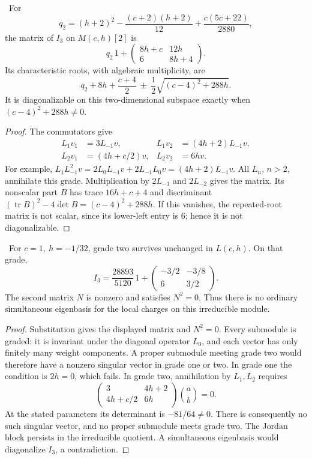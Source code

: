 \begin{proposition}\ours\ 
For
\[
 q_2=(h+2)^2-\frac{(c+2)(h+2)}{12}+\frac{c(5c+22)}{2880},
\]
the matrix of \(I_3\) on \(M(c,h)[2]\) is
\[
 q_2\,1+\begin{pmatrix}8h+c&12h\\6&8h+4\end{pmatrix}.
\]
Its characteristic roots, with algebraic multiplicity, are
\[
 q_2+8h+\frac{c+4}{2}
       \ \pm\ \frac12\sqrt{(c-4)^2+288h}.
\]
It is diagonalizable on this two-dimensional subspace exactly when
\((c-4)^2+288h\ne0\).
\end{proposition}
\begin{proof}
The commutators give
\[
\begin{aligned}
 L_1v_1&=3L_{-1}v,&L_1v_2&=(4h+2)L_{-1}v,\\
 L_2v_1&=(4h+c/2)v,&L_2v_2&=6hv.
\end{aligned}
\]
For example,
\(L_1L_{-1}^2v=2L_0L_{-1}v+2L_{-1}L_0v
=(4h+2)L_{-1}v\).
All \(L_n\), \(n>2\), annihilate this grade. Multiplication by
\(2L_{-1}\) and \(2L_{-2}\) gives the matrix.
Its nonscalar part \(B\) has trace \(16h+c+4\) and discriminant
\((\operatorname{tr}B)^2-4\det B=(c-4)^2+288h\).
If this vanishes, the repeated-root matrix is not scalar, since its
lower-left entry is \(6\); hence it is not diagonalizable.
\end{proof}

\begin{proposition}[A Jordan block in an irreducible quotient]\ours\ 
For \(c=1,\ h=-1/32\), grade two survives unchanged in \(L(c,h)\).
On that grade,
\[
 I_3=\frac{28893}{5120}\,1+
       \begin{pmatrix}-3/2&-3/8\\6&3/2\end{pmatrix}.
\]
The second matrix \(N\) is nonzero and satisfies \(N^2=0\).
Thus there is no ordinary simultaneous eigenbasis for the local charges
on this irreducible module.
\end{proposition}
\begin{proof}
Substitution gives the displayed matrix and \(N^2=0\).
Every submodule is graded: it is invariant under the diagonal operator
\(L_0\), and each vector has only finitely many weight components.
A proper submodule meeting grade two would therefore have a nonzero
singular vector in grade one or two. In grade one the condition is
\(2h=0\), which fails. In grade two, annihilation by \(L_1,L_2\)
requires
\[
 \begin{pmatrix}3&4h+2\\4h+c/2&6h\end{pmatrix}\binom ab=0.
\]
At the stated parameters its determinant is \(-81/64\ne0\).
There is consequently no such singular vector, and no proper
submodule meets grade two. The Jordan block persists in the
irreducible quotient. A simultaneous eigenbasis would diagonalize
\(I_3\), a contradiction.
\end{proof}


